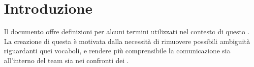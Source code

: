 \chapter{Introduzione}\label{chap:intro}

Il documento offre definizioni per alcuni termini utilizzati nel contesto di questo . La creazione di questa  è motivata dalla necessità di rimuovere possibili ambiguità riguardanti quei vocaboli, e rendere più comprensibile la comunicazione sia all'interno del team sia nei confronti dei .